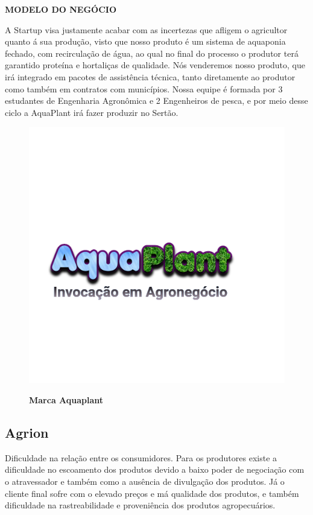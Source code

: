 \textbf{MODELO DO NEGÓCIO}

A Startup visa justamente acabar com as incertezas que  afligem o agricultor quanto á sua produção, visto que nosso produto é um sistema de aquaponia fechado, com recirculação de água, ao qual no final do processo o produtor terá garantido proteína e hortaliças de qualidade. Nós venderemos nosso produto, que irá integrado em pacotes de assistência técnica, tanto diretamente ao produtor como também em contratos com municípios. Nossa equipe é formada por 3 estudantes de Engenharia Agronômica e 2 Engenheiros de pesca, e por meio desse ciclo a AquaPlant irá fazer produzir no Sertão.


\begin{figure}[!htb]
\centering
\caption{\textbf{Marca Aquaplant}}
\includegraphics[scale=0.4]{Imagens/aquaplant.png}
\label{figura_13}
\end{figure}
\newpage

\subsection{Agrion}

Dificuldade na relação entre os consumidores. Para os produtores existe a 
dificuldade no escoamento dos produtos devido a baixo poder de negociação com o atravessador e também como a ausência  de divulgação dos produtos. Já o cliente final sofre com o elevado preços e má qualidade dos produtos, e também dificuldade na rastreabilidade e proveniência dos produtos agropecuários.

